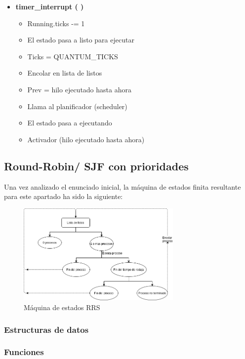 \documentclass[10pt, spanish, pdftex]{template/UC3M_document}
\begin{document}
\begin{itemize}
    \item \textbf{timer\_interrupt ( )}
    \begin{itemize}
        \item Running.ticks -= 1
        \item El estado pasa a listo para ejecutar
        \item Ticks = QUANTUM\_TICKS
        \item Encolar en lista de listos
        \item Prev = hilo ejecutado hasta ahora
        \item Llama al planificador (scheduler)
        \item El estado pasa a ejecutando
        \item Activador (hilo ejecutado hasta ahora)

    \end{itemize}
\end{itemize}

\subsection{Round-Robin/ SJF con prioridades}
Una vez analizado el enunciado inicial, la máquina de estados finita resultante para este apartado ha sido la siguiente:

\vspace{0.5cm}
\begin{figure}[h]
    \centering
    \includegraphics[width=8cm]{arboles/RoundRobin.png}
    \caption{Máquina de estados RRS}
\end{figure}

\subsubsection{Estructuras de datos}
\subsubsection{Funciones}
\end{document}

